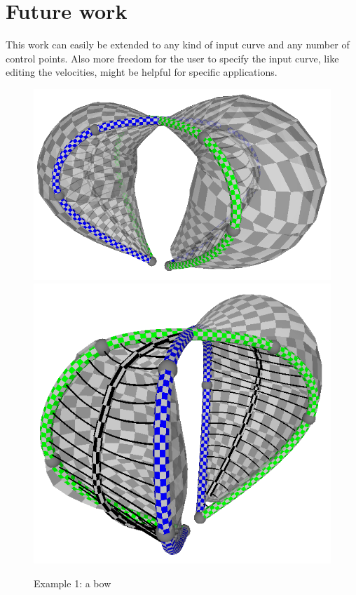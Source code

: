 \documentclass[journal, letterpaper]{IEEEtran}
\begin{document}
\section{Future work}
This work can easily be extended to any kind of input curve and any number of control points.
Also more freedom for the user to specify the input curve, like editing the velocities, might be helpful for specific applications.

\begin{figure}
	\centering
		\includegraphics[scale=0.4]{images/Result1.png}
		\includegraphics[scale=0.4]{images/Result2.png}
	\caption{Example 1: a bow}
	\label{fig:Result1}
\end{figure}
\end{document}

